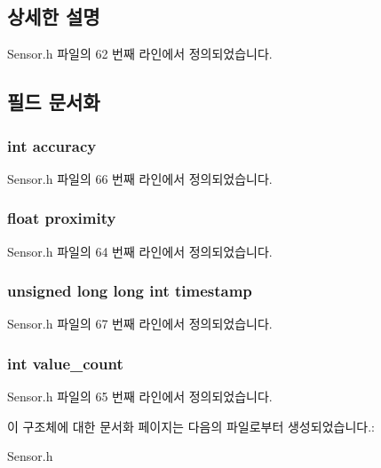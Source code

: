 \subsection{상세한 설명}


Sensor.\-h 파일의 62 번째 라인에서 정의되었습니다.



\subsection{필드 문서화}
\hypertarget{struct__Proximity__data_a5565cf9073275f9713f9016e7c10d25f}{
\subsubsection[{accuracy}]{\setlength{\rightskip}{0pt plus 5cm}int accuracy}}\label{struct__Proximity__data_a5565cf9073275f9713f9016e7c10d25f}


Sensor.\-h 파일의 66 번째 라인에서 정의되었습니다.

\hypertarget{struct__Proximity__data_a5767a762273412ecff24202966e9d67b}{
\subsubsection[{proximity}]{\setlength{\rightskip}{0pt plus 5cm}float proximity}}\label{struct__Proximity__data_a5767a762273412ecff24202966e9d67b}


Sensor.\-h 파일의 64 번째 라인에서 정의되었습니다.

\hypertarget{struct__Proximity__data_a8de02c4128636a7bf630ff5428f60c8d}{
\subsubsection[{timestamp}]{\setlength{\rightskip}{0pt plus 5cm}unsigned long long int timestamp}}\label{struct__Proximity__data_a8de02c4128636a7bf630ff5428f60c8d}


Sensor.\-h 파일의 67 번째 라인에서 정의되었습니다.

\hypertarget{struct__Proximity__data_a40a079bfc72408819dc78da308203a74}{
\subsubsection[{value\-\_\-count}]{\setlength{\rightskip}{0pt plus 5cm}int value\-\_\-count}}\label{struct__Proximity__data_a40a079bfc72408819dc78da308203a74}


Sensor.\-h 파일의 65 번째 라인에서 정의되었습니다.



이 구조체에 대한 문서화 페이지는 다음의 파일로부터 생성되었습니다.\-:\begin{DoxyCompactItemize}
\item 
Sensor.\-h\end{DoxyCompactItemize}
